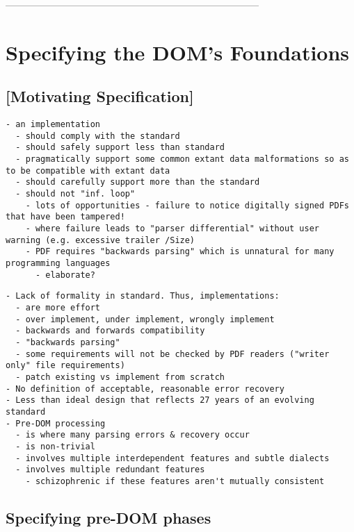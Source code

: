 ------------------------------------------------------------------------------
\section{Specifying the DOM's Foundations }
\label{sec:specifying}

\subsection{[Motivating Specification]}

\begin{lstlisting}[style=meta]
- an implementation
  - should comply with the standard
  - should safely support less than standard
  - pragmatically support some common extant data malformations so as to be compatible with extant data
  - should carefully support more than the standard
  - should not "inf. loop"
    - lots of opportunities - failure to notice digitally signed PDFs that have been tampered!
    - where failure leads to "parser differential" without user warning (e.g. excessive trailer /Size)
    - PDF requires "backwards parsing" which is unnatural for many programming languages
      - elaborate?
\end{lstlisting}

\begin{lstlisting}[style=meta]
- Lack of formality in standard. Thus, implementations:
  - are more effort
  - over implement, under implement, wrongly implement
  - backwards and forwards compatibility
  - "backwards parsing"
  - some requirements will not be checked by PDF readers ("writer only" file requirements) 
  - patch existing vs implement from scratch
- No definition of acceptable, reasonable error recovery
- Less than ideal design that reflects 27 years of an evolving standard
- Pre-DOM processing
  - is where many parsing errors & recovery occur
  - is non-trivial
  - involves multiple interdependent features and subtle dialects
  - involves multiple redundant features
    - schizophrenic if these features aren't mutually consistent
\end{lstlisting}

\subsection{Specifying pre-DOM phases}

\iffalse
\begin{code}
{-# LANGUAGE EmptyDataDecls, TypeOperators, LambdaCase #-}
module Spec where

import           Control.Monad
import           Data.Char
import           Data.Foldable(foldlM)
import qualified Data.Map as M
import           Data.Map(Map)

import           Types
import           Utils
import           Primitives
\end{code}
\fi

